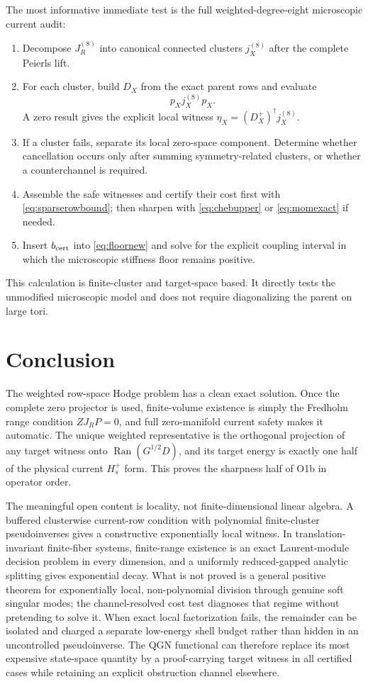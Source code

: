 \documentclass[11pt]{article}
\theoremstyle{definition}
\theoremstyle{remark}
\newcommand{\Ran}{\operatorname{Ran}}
\begin{document}
The most informative immediate test is the full weighted-degree-eight microscopic current audit:
\begin{enumerate}
\item Decompose $J_R^{(8)}$ into canonical connected clusters $j_X^{(8)}$ after the complete Peierls lift.
\item For each cluster, build $D_X$ from the exact parent rows and evaluate
\[
 p_Xj_X^{(8)}p_X.
\]
A zero result gives the explicit local witness
$\eta_X=(D_X^+)^\dagger j_X^{(8)}$.
\item If a cluster fails, separate its local zero-space component.  Determine whether cancellation occurs only after summing symmetry-related clusters, or whether a counterchannel is required.
\item Assemble the safe witnesses and certify their cost first with \eqref{eq:sparserowbound}; then sharpen with \eqref{eq:chebupper} or \eqref{eq:momexact} if needed.
\item Insert $b_{\rm cert}$ into \eqref{eq:floornew} and solve for the explicit coupling interval in which the microscopic stiffness floor remains positive.
\end{enumerate}
This calculation is finite-cluster and target-space based.  It directly tests the unmodified microscopic model and does not require diagonalizing the parent on large tori.

\section{Conclusion}

The weighted row-space Hodge problem has a clean exact solution.  Once the complete zero projector is used, finite-volume existence is simply the Fredholm range condition $ZJ_RP=0$, and full zero-manifold current safety makes it automatic.  The unique weighted representative is the orthogonal projection of any target witness onto $\Ran(G^{1/2}D)$, and its target energy is exactly one half of the physical current $H_s^+$ form.  This proves the sharpness half of O1b in operator order.

The meaningful open content is locality, not finite-dimensional linear algebra.  A buffered clusterwise current-row condition with polynomial finite-cluster pseudoinverses gives a constructive exponentially local witness.  In translation-invariant finite-fiber systems, finite-range existence is an exact Laurent-module decision problem in every dimension, and a uniformly reduced-gapped analytic splitting gives exponential decay.  What is not proved is a general positive theorem for exponentially local, non-polynomial division through genuine soft singular modes; the channel-resolved cost test diagnoses that regime without pretending to solve it.  When exact local factorization fails, the remainder can be isolated and charged a separate low-energy shell budget rather than hidden in an uncontrolled pseudoinverse.  The QGN functional can therefore replace its most expensive state-space quantity by a proof-carrying target witness in all certified cases while retaining an explicit obstruction channel elsewhere.
\end{document}
